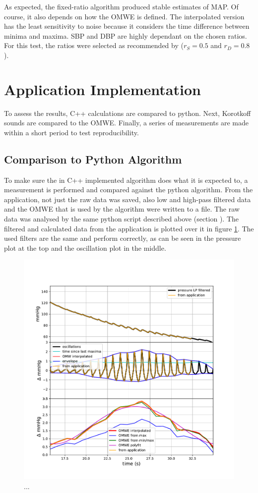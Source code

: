 As expected, the fixed-ratio algorithm produced stable estimates of MAP. Of course, it also depends on how the OMWE is defined. The interpolated version has the least sensitivity to noise because it considers the time difference between minima and maxima. SBP and DBP are highly dependant on the chosen ratios. For this test, the ratios were selected as recommended by \citet{Geddes1982} ($r_S =0.5$ and $r_D=0.8$).



\section{Application Implementation}
To assess the results,  C++ calculations are compared to python. Next, Korotkoff sounds are compared to the OMWE. Finally, a series of measurements are made within a short period to test reproducibility.


\subsection{Comparison to Python Algorithm}
To make sure the in C++ implemented algorithm does what it is expected to, a measurement is performed and compared against the python algorithm. From the application, not just the raw data was saved, also low and high-pass filtered data and the OMWE that is used by the algorithm were written to a file. The raw data was analysed by the same python script described above (section ). The filtered and calculated data from the application is plotted over it in figure \ref{fig:comp}. The used filters are the same and perform correctly, as can be seen in the pressure plot at the top and the oscillation plot in the middle. 

\begin{figure}[ht!]
\centering
\includegraphics[width=\textwidth]{figures/compare_proces_signal.pdf}
\caption{...}
\label{fig:comp}
\end{figure} 

